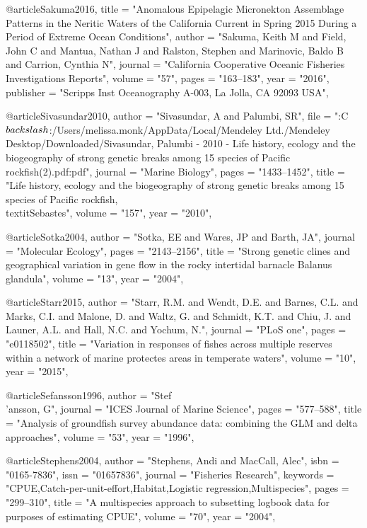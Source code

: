 @article{Sakuma2016,
    title = "{Anomalous Epipelagic Micronekton Assemblage Patterns in the Neritic Waters of the California Current in Spring 2015 During a Period of Extreme Ocean Conditions}",
    author = "{Sakuma, Keith M and Field, John C and Mantua, Nathan J and Ralston, Stephen and Marinovic, Baldo B and Carrion, Cynthia N}",
    journal = "{California Cooperative Oceanic Fisheries Investigations Reports}",
    volume = "{57}",
    pages = "{163--183}",
    year = "{2016}",
    publisher = "{Scripps Inst Oceanography A-003, La Jolla, CA 92093 USA}",
}

@article{Sivasundar2010,
    author = "{Sivasundar, A and Palumbi, SR}",
    file = "{:C$\\backslash$:/Users/melissa.monk/AppData/Local/Mendeley Ltd./Mendeley Desktop/Downloaded/Sivasundar, Palumbi - 2010 - Life history, ecology and the biogeography of strong genetic breaks among 15 species of Pacific rockfish(2).pdf:pdf}",
    journal = "{Marine Biology}",
    pages = "{1433--1452}",
    title = "{{Life history, ecology and the biogeography of strong genetic breaks among 15 species of Pacific rockfish, \\textit{{Sebastes}}}}",
    volume = "{157}",
    year = "{2010}",
}

@article{Sotka2004,
    author = "{Sotka, EE and Wares, JP and Barth, JA}",
    journal = "{Molecular Ecology}",
    pages = "{2143--2156}",
    title = "{{Strong genetic clines and geographical variation in gene flow in the rocky intertidal barnacle Balanus glandula}}",
    volume = "{13}",
    year = "{2004}",
}

@article{Starr2015,
    author = "{Starr, R.M. and Wendt, D.E. and Barnes, C.L. and Marks, C.I. and Malone, D. and Waltz, G. and Schmidt, K.T. and Chiu, J. and Launer, A.L. and Hall, N.C. and Yochum, N.}",
    journal = "{PLoS one}",
    pages = "{e0118502}",
    title = "{{Variation in responses of fishes across multiple reserves within a network of marine protectes areas in temperate waters}}",
    volume = "{10}",
    year = "{2015}",
}

@article{Sefansson1996,
    author = "{Stef\\'{a}nsson, G}",
    journal = "{ICES Journal of Marine Science}",
    pages = "{577--588}",
    title = "{{Analysis of groundfish survey abundance data: combining the GLM and delta approaches}}",
    volume = "{53}",
    year = "{1996}",
}

@article{Stephens2004,
    author = "{Stephens, Andi and MacCall, Alec}",
    isbn = "{0165-7836}",
    issn = "{01657836}",
    journal = "{Fisheries Research}",
    keywords = "{CPUE,Catch-per-unit-effort,Habitat,Logistic regression,Multispecies}",
    pages = "{299--310}",
    title = "{{A multispecies approach to subsetting logbook data for purposes of estimating CPUE}}",
    volume = "{70}",
    year = "{2004}",
}

